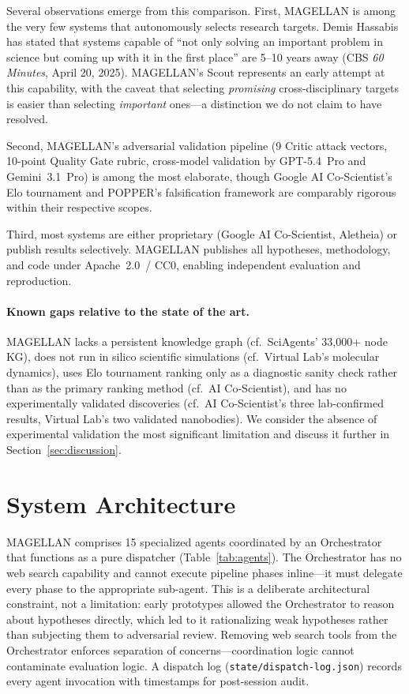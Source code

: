 Several observations emerge from this comparison. First, MAGELLAN is among the very few systems that autonomously selects research targets. Demis Hassabis has stated that systems capable of ``not only solving an important problem in science but coming up with it in the first place'' are 5--10 years away (CBS \emph{60 Minutes}, April 20, 2025). MAGELLAN's Scout represents an early attempt at this capability, with the caveat that selecting \emph{promising} cross-disciplinary targets is easier than selecting \emph{important} ones---a distinction we do not claim to have resolved.

Second, MAGELLAN's adversarial validation pipeline (9 Critic attack vectors, 10-point Quality Gate rubric, cross-model validation by GPT-5.4~Pro and Gemini~3.1~Pro) is among the most elaborate, though Google AI Co-Scientist's Elo tournament and POPPER's falsification framework are comparably rigorous within their respective scopes.

Third, most systems are either proprietary (Google AI Co-Scientist, Aletheia) or publish results selectively. MAGELLAN publishes all hypotheses, methodology, and code under Apache~2.0~/ CC0, enabling independent evaluation and reproduction.

\paragraph{Known gaps relative to the state of the art.} MAGELLAN lacks a persistent knowledge graph (cf.\ SciAgents' 33,000+ node KG), does not run in silico scientific simulations (cf.\ Virtual Lab's molecular dynamics), uses Elo tournament ranking only as a diagnostic sanity check rather than as the primary ranking method (cf.\ AI Co-Scientist), and has no experimentally validated discoveries (cf.\ AI Co-Scientist's three lab-confirmed results, Virtual Lab's two validated nanobodies). We consider the absence of experimental validation the most significant limitation and discuss it further in Section~\ref{sec:discussion}.


\section{System Architecture}
\label{sec:architecture}

MAGELLAN comprises 15 specialized agents coordinated by an Orchestrator that functions as a pure dispatcher (Table~\ref{tab:agents}). The Orchestrator has no web search capability and cannot execute pipeline phases inline---it must delegate every phase to the appropriate sub-agent. This is a deliberate architectural constraint, not a limitation: early prototypes allowed the Orchestrator to reason about hypotheses directly, which led to it rationalizing weak hypotheses rather than subjecting them to adversarial review. Removing web search tools from the Orchestrator enforces separation of concerns---coordination logic cannot contaminate evaluation logic. A dispatch log (\texttt{state/dispatch-log.json}) records every agent invocation with timestamps for post-session audit.

